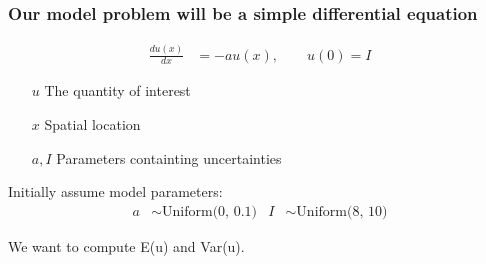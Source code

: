 \documentclass[handout]{beamer}
\begin{document}
\begin{frame}
 \frametitle{Our model problem will be a simple differential equation}
 \vspace{-10mm}
  \begin{align*}
    \frac{d u(x)}{dx} & =-au(x),\qquad u(0) = I
  \end{align*}
  \vspace{-5 mm}
  \begin{itemize}
    \item[$u$] The quantity of interest
    \item[$x$] Spatial location
    \item[$a,I$] Parameters containting uncertainties
  \end{itemize}
\vspace{8 mm}
 \pause
Initially assume model parameters:
\begin{align*}
a &\sim \text{Uniform(0, 0.1)} & I& \sim \text{Uniform(8, 10)}
\end{align*}

\pause
\vspace{5mm}
We want to compute E(u) and Var(u).

\end{frame}
\end{document}
